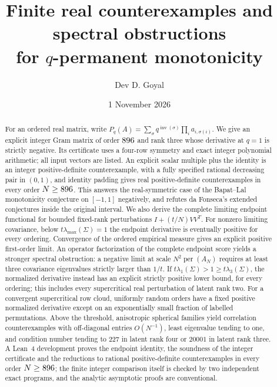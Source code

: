\documentclass[11pt]{article}
\title{Finite real counterexamples and spectral obstructions\protect\\
for $q$-permanent monotonicity}
\author{Dev D. Goyal}
\date{1 November 2026}
\theoremstyle{remark}\newtheorem{remark}[theorem]{Remark}
\newcommand{\per}{\operatorname{per}}
\newcommand{\inv}{\operatorname{inv}}
\begin{document}
\maketitle
\begin{abstract}
For an ordered real matrix, write
$P_q(A)=\sum_{\sigma}q^{\inv(\sigma)}\prod_i a_{i,\sigma(i)}$.
We give an explicit integer Gram matrix of order $896$ and rank three
whose derivative at $q=1$ is strictly negative. Its certificate uses a
four-row symmetry and exact integer polynomial arithmetic; all input
vectors are listed. An explicit scalar multiple plus the identity is an
integer positive-definite counterexample, with a fully specified rational
decreasing pair in $(0,1)$, and identity padding gives real
positive-definite counterexamples in every order $N\ge896$. This
answers the real-symmetric case of the Bapat--Lal monotonicity
conjecture on $[-1,1]$ negatively, and refutes da Fonseca's extended
conjectures inside the original interval. We also derive the complete limiting endpoint
functional for bounded fixed-rank perturbations $I+(t/N)VV^T$.
For nonzero limiting covariance, below $t\lambda_{\max}(\Sigma)=1$ the
endpoint derivative is eventually positive for every ordering. Convergence
of the ordered empirical measure gives an explicit positive first-order limit.
An operator factorization of the complete endpoint score yields a stronger
spectral obstruction: a negative limit at scale $N^2\per(A_N)$ requires
at least three covariance eigenvalues strictly larger than $1/t$.
If $t\lambda_1(\Sigma)>1\ge t\lambda_3(\Sigma)$, the normalized
derivative instead has an explicit strictly positive lower bound, for
every ordering; this includes every supercritical real perturbation of
latent rank two.
For a convergent supercritical row cloud, uniformly random orders have a
fixed positive normalized derivative except on an exponentially small
fraction of labelled permutations.
Above the threshold, anisotropic spherical families yield correlation
counterexamples with off-diagonal entries $O(N^{-1})$, least eigenvalue
tending to one, and condition number tending to $227$ in latent rank four
or $20001$ in latent rank three. A Lean~4 development proves the
endpoint identity, the soundness of the integer certificate and the
reductions to rational positive-definite counterexamples in every order
$N\ge896$; the finite integer comparison itself is checked by two
independent exact programs, and the analytic asymptotic proofs are
conventional.
\end{abstract}
\end{document}
